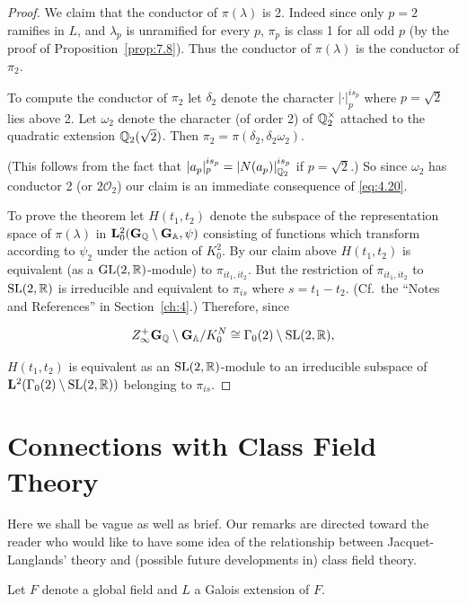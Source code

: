 \begin{proof}

We claim that the conductor of $\pi(\lambda)$ is 2. Indeed since only $p = 2$ ramifies in $L$, and $\lambda_p$ is unramified for every $p$, $\pi_p$ is class 1 for all odd $p$ (by the proof of Proposition~\ref{prop:7.8}). Thus the conductor of $\pi(\lambda)$ is the conductor of $\pi_2$.

To compute the conductor of $\pi_2$ let $\delta_2$ denote the character $|\cdot|_p^{is_p}$ where $p = \sqrt{2}$ lies above 2. Let $\omega_2$ denote the character (of order 2) of $\mathbb{Q}_2^{\times}$ attached to the quadratic extension $\mathbb{Q}_2(\sqrt{2})$. Then $\pi_2 = \pi(\delta_2, \delta_2\omega_2)$.

(This follows from the fact that $|a_p|_p^{is_p} = |N(a_p)|_{\mathbb{Q}_2}^{is_p}$ if $p = \sqrt{2}$.) So since $\omega_2$ has conductor 2 (or $2\mathcal{O}_2$) our claim is an immediate consequence of \eqref{eq:4.20}.

To prove the theorem let $H(t_1, t_2)$ denote the subspace of the representation space of $\pi(\lambda)$ in $\mathbf{L}_0^2(\mathbf{G}_{\mathbb{Q}} \setminus \mathbf{G}_{\mathbb{A}}, \psi)$ consisting of functions which transform according to $\psi_2$ under the action of $K_0^2$. By our claim above $H(t_1, t_2)$ is equivalent (as a $\operatorname{GL}(2,\mathbb{R})$-module) to $\pi_{it_1,it_2}$. But the restriction of $\pi_{it_1,it_2}$ to $\operatorname{SL}(2,\mathbb{R})$ is irreducible and equivalent to $\pi_{is}$ where $s = t_1 - t_2$. (Cf.\ the ``Notes and References'' in Section~\ref{ch:4}.) Therefore, since

\[
Z_\infty^+ \mathbf{G}_{\mathbb{Q}} \setminus \mathbf{G}_{\mathbb{A}} / K_0^N \cong \Gamma_0(2)\setminus\operatorname{SL}(2,\mathbb{R}),
\]

$H(t_1,t_2)$ is equivalent as an $\operatorname{SL}(2,\mathbb{R})$-module to an irreducible subspace of $\mathbf{L}^2(\Gamma_0(2)\setminus\operatorname{SL}(2,\mathbb{R}))$ belonging to $\pi_{is}$.

\end{proof}

\section{Connections with Class Field Theory}\label{sec:7d}

Here we shall be vague as well as brief. Our remarks are directed toward the reader who would like to have some idea of the relationship between Jacquet-Langlands' theory and (possible future developments in) class field theory.

Let $F$ denote a global field and $L$ a Galois extension of $F$.

